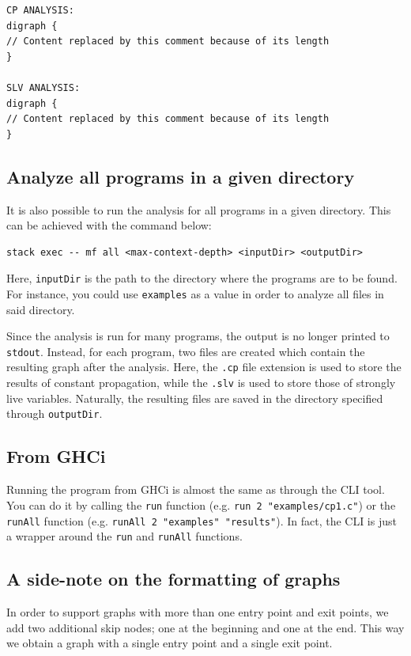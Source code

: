 \documentclass{article}
\begin{document}
\begin{verbatim}
CP ANALYSIS:
digraph {
// Content replaced by this comment because of its length
}

SLV ANALYSIS:
digraph {
// Content replaced by this comment because of its length
}
\end{verbatim}

\subsection*{Analyze all programs in a given directory}

It is also possible to run the analysis for all programs in a given directory. This can be achieved with the command below:

\begin{verbatim}
stack exec -- mf all <max-context-depth> <inputDir> <outputDir>
\end{verbatim}

Here, \texttt{inputDir} is the path to the directory where the programs are to be found. For instance, you could use \texttt{examples} as a value in order to analyze all files in said directory.

Since the analysis is run for many programs, the output is no longer printed to \texttt{stdout}. Instead, for each program, two files are created which contain the resulting graph after the analysis. Here, the \texttt{.cp} file extension is used to store the results of constant propagation, while the \texttt{.slv} is used to store those of strongly live variables. Naturally, the resulting files are saved in the directory specified through \texttt{outputDir}.

\subsection*{From GHCi}

Running the program from GHCi is almost the same as through the CLI tool. You can do it by calling the \texttt{run} function (e.g. \texttt{run 2 "examples/cp1.c"}) or the \texttt{runAll} function (e.g. \texttt{runAll 2 "examples" "results"}). In fact, the CLI is just a wrapper around the \texttt{run} and \texttt{runAll} functions.

\subsection*{A side-note on the formatting of graphs}

In order to support graphs with more than one entry point and exit points, we add two additional skip nodes; one at the beginning and one at the end. This way we obtain a graph with a single entry point and a single exit point.
\end{document}

